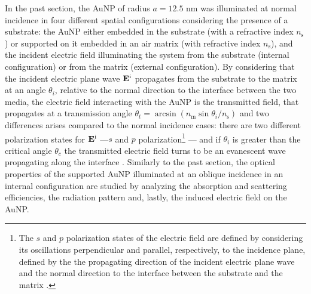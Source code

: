 
In the past section, the AuNP of radius $a = 12.5$ nm was illuminated at normal incidence in four different spatial configurations considering the  presence of a substrate: the AuNP either embedded in the substrate (with a refractive index $n_\text{s}$) or supported on it embedded in an air matrix (with refractive index $n_\text{s}$), and the incident electric field  illuminating the system from the substrate (internal configuration) or from the matrix (external configuration). By considering that the incident electric plane wave $\vb{E}^\text{i}$  propagates from the substrate to the matrix at an angle $\theta_i$, relative to the normal direction to the interface between the two media, the electric field interacting with the AuNP is the transmitted field, that propagates at a transmission angle $\theta_t = \arcsin(n_\text{m}\sin\theta_i/n_\text{s})$ \cite{born_max_principle_1999} and two differences arises compared to the normal incidence cases: there are two different polarization states for $\vb{E}^\text{i}$ ---$s$ and $p$ polarization\footnote{%
    The $s$ and $p$ polarization states of the electric field are defined by considering its oscillations perpendicular and parallel, respectively, to the incidence plane, defined by the the propagating direction of the incident electric plane wave and the normal direction to the interface between the substrate and the matrix \cite{bohren_absorption_1983}.}%
--- and if $\theta_i$ is greater than the critical angle $\theta_c$ the transmitted electric field turns to be an evanescent wave propagating along the interface  \cite{born_max_principle_1999}. Similarly to the past section, the optical properties of the supported AuNP illuminated at an oblique incidence in an internal configuration are studied by analyzing the absorption and scattering efficiencies, the radiation pattern and, lastly, the induced electric field on the AuNP.

